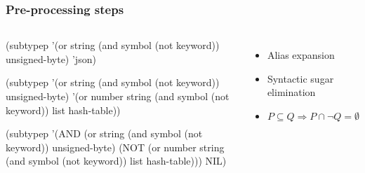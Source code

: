 \documentclass[aspectratio=169]{beamer}
\newcommand\Rarr{\ensuremath{\Rightarrow}}
\begin{document}
\begin{frame}[fragile]
  \frametitle{Pre-processing steps}
  \begin{columns}
    \begin{overprint}
\begin{clcode}
(subtypep '(or string
               (and symbol
                    (not keyword))
               unsigned-byte)
          'json)
\end{clcode}

\begin{clcode}
(subtypep '(or string
               (and symbol
                    (not keyword))
               unsigned-byte)
          '(or number
               string
               (and symbol
                    (not keyword))
               list
               hash-table))
\end{clcode}

\begin{clcode}
(subtypep
 '(AND (or string
           (and symbol
                (not keyword))
           unsigned-byte)
        (NOT (or number
                 string
                 (and symbol
                      (not keyword))
                 list
                 hash-table)))
 NIL)
\end{clcode}
    \end{overprint}

    \begin{itemize}
    \item<2-> Alias expansion
    \item<3-> Syntactic sugar elimination
    \item<4-> $P \subseteq Q \Rarr P \cap \neg Q = \emptyset$
    \end{itemize}
  \end{columns}
\end{frame}
\end{document}

